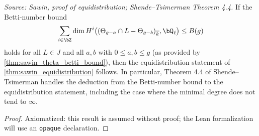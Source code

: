 \begin{theorem}
  \label{thm:ts_4_4}
  \textit{Source: Sawin, proof of equidistribution; Shende--Tsimerman Theorem 4.4.}
  If the Betti-number bound
  \[ \sum_{i\in\bZ}\dim H^i\bigl((\Theta_{g-a}\cap L-\Theta_{g-b})_{\overline k},
     \bQ_\ell\bigr) \le B(g) \]
  holds for all $L\in J$ and all $a,b$ with $0\le a,b\le g$ (as provided by
  \cref{thm:sawin_theta_betti_bound}), then the equidistribution statement of
  \cref{thm:sawin_equidistribution} follows.  In particular, Theorem 4.4 of
  Shende--Tsimerman handles the deduction from the Betti-number bound to the
  equidistribution statement, including the case where the minimal degree does not
  tend to $\infty$.
\end{theorem}

\begin{proof}
  Axiomatized: this result is assumed without proof; the Lean formalization will use
  an \texttt{opaque} declaration.
\end{proof}
